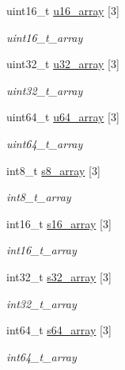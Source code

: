 \begin{DoxyCompactItemize}
uint16\+\_\+t \mbox{\hyperlink{struct____mavlink__test__types__t_a696bb2eddcaa7efd43d3fabd8d78ec2b}{u16\+\_\+array}} \mbox{[}3\mbox{]}
\begin{DoxyCompactList}\small\item\em uint16\+\_\+t\+\_\+array \end{DoxyCompactList}\item 
uint32\+\_\+t \mbox{\hyperlink{struct____mavlink__test__types__t_aa69b1097955cef5923afdd3b2dbf7d8f}{u32\+\_\+array}} \mbox{[}3\mbox{]}
\begin{DoxyCompactList}\small\item\em uint32\+\_\+t\+\_\+array \end{DoxyCompactList}\item 
uint64\+\_\+t \mbox{\hyperlink{struct____mavlink__test__types__t_a806ec06b161773845dc2b82ea96decbf}{u64\+\_\+array}} \mbox{[}3\mbox{]}
\begin{DoxyCompactList}\small\item\em uint64\+\_\+t\+\_\+array \end{DoxyCompactList}\item 
int8\+\_\+t \mbox{\hyperlink{struct____mavlink__test__types__t_a98f56196a247a067143bbe2d0ddcef7e}{s8\+\_\+array}} \mbox{[}3\mbox{]}
\begin{DoxyCompactList}\small\item\em int8\+\_\+t\+\_\+array \end{DoxyCompactList}\item 
int16\+\_\+t \mbox{\hyperlink{struct____mavlink__test__types__t_af36949c40ba0eef9807d3b5686db4e38}{s16\+\_\+array}} \mbox{[}3\mbox{]}
\begin{DoxyCompactList}\small\item\em int16\+\_\+t\+\_\+array \end{DoxyCompactList}\item 
int32\+\_\+t \mbox{\hyperlink{struct____mavlink__test__types__t_a4604145aed91a9ccbe3e3cbc95930244}{s32\+\_\+array}} \mbox{[}3\mbox{]}
\begin{DoxyCompactList}\small\item\em int32\+\_\+t\+\_\+array \end{DoxyCompactList}\item 
int64\+\_\+t \mbox{\hyperlink{struct____mavlink__test__types__t_ab4415ae5e296db35b294bef9deddf02a}{s64\+\_\+array}} \mbox{[}3\mbox{]}
\begin{DoxyCompactList}\small\item\em int64\+\_\+t\+\_\+array \end{DoxyCompactList}\item 

\end{DoxyCompactItemize}
